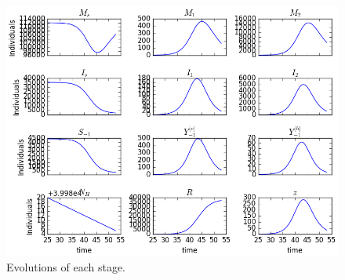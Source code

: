 \begin{figure}[h]
	\centering
	\includegraphics[width=\textwidth, keepaspectratio]{populations_grid.png}
	\caption{Evolutions of each stage.}\label{fig:population_grid}
\end{figure}
